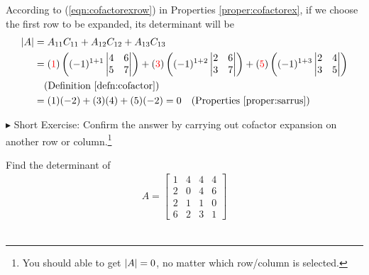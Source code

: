 \begin{solution}
According to (\ref{eqn:cofactorexrow}) in Properties \ref{proper:cofactorex}, if we choose the first row to be expanded, its determinant will be
\begin{align*}
|A| &= A_{11}C_{11} + A_{12}C_{12} + A_{13}C_{13} \\
&= (\textcolor{red}{1})\left((-1)^{1+1}
\begin{vmatrix}
4 & 6 \\
5 & 7
\end{vmatrix}\right)
+
(\textcolor{red}{3})\left((-1)^{1+2}
\begin{vmatrix}
2 & 6 \\
3 & 7
\end{vmatrix}\right) + 
(\textcolor{red}{5})\left((-1)^{1+3}
\begin{vmatrix}
2 & 4 \\
3 & 5
\end{vmatrix}\right) \\
&\quad \text{(Definition \ref{defn:cofactor})}\\
&= (1)(-2) + (3)(4) + (5)(-2) = 0 \quad \text{(Properties \ref{proper:sarrus})} 
\end{align*}
\end{solution}
$\blacktriangleright$ Short Exercise: Confirm the answer by carrying out cofactor expansion on another row or column.\footnote{You should able to get $\abs{A} = 0$, no matter which row/column is selected.}
\begin{exmp}
\label{exmp:4x4det}
Find the determinant of
\begin{align*}
A = 
\begin{bmatrix}
1 & 4 & 4 & 4 \\
2 & 0 & 4 & 6 \\
2 & 1 & 1 & 0 \\
6 & 2 & 3 & 1
\end{bmatrix}
\end{align*}\
\end{exmp}
